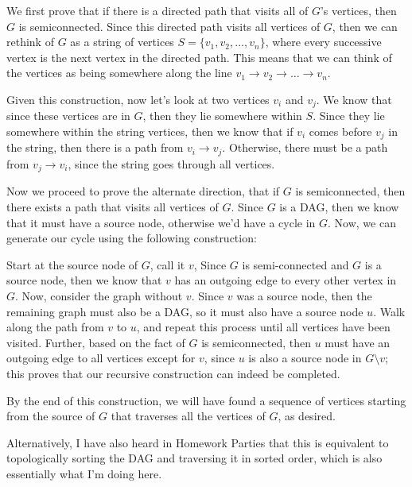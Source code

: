 \documentclass[10.5pt]{article}
\begin{document}
\begin{solution}
	We first prove that if there is a directed path that visits all of $G$'s vertices, then $G$ is semiconnected.
	Since this directed path visits all vertices of $G$, then we can rethink of $G$ as a string of vertices 
	$S = \{v_1, v_2, \dots, v_n\}$, where every successive vertex is the next vertex in the directed path. This 
	means that we can think of the vertices as being somewhere along the line $v_1 \to v_2 \to \dots \to v_n$. 

	Given this construction, now let's look at two vertices $v_i$ and $v_j$. We know that since these vertices
	are in $G$, then they lie somewhere within $S$. Since they lie somewhere within the string vertices, 
	then we know that if $v_i$ comes before $v_j$ in the string, then there is a path from $v_i \to v_j$. 
	Otherwise, there must be a path from $v_j \to v_i$, since the string goes through all vertices.

	Now we proceed to prove the alternate direction, that if $G$ is semiconnected, then there exists 
	a path that visits all vertices of $G$. Since $G$ is a DAG, then we know that it must have a source node, 
	otherwise we'd have a cycle in $G$. Now, we can generate our cycle using the following construction:
	
	Start at the source node of $G$, call it $v$, Since $G$ is semi-connected and $G$ is a source node,
	then we know that $v$ has an outgoing edge to every other vertex in $G$. Now, consider the 
	graph without $v$. Since $v$ was a source node, then the remaining graph must also be a DAG, so 
	it must also have a source node $u$. Walk along the path from $v$ to $u$, and repeat this process until 
	all vertices have been visited. Further, based on the fact of $G$ is semiconnected, then $u$ must have an 
	outgoing edge to all vertices except for $v$, since $u$ is also a source node in $G \setminus v$; this 
	proves that our recursive construction can indeed be completed.

	By the end of this construction, we will have found a sequence of vertices starting from the source 
	of $G$ that traverses all the vertices of $G$, as desired.

	Alternatively, I have also heard in Homework Parties that this is equivalent to topologically sorting 
	the DAG and traversing it in sorted order, which is also essentially what I'm doing here. 
\end{solution}
\end{document}
